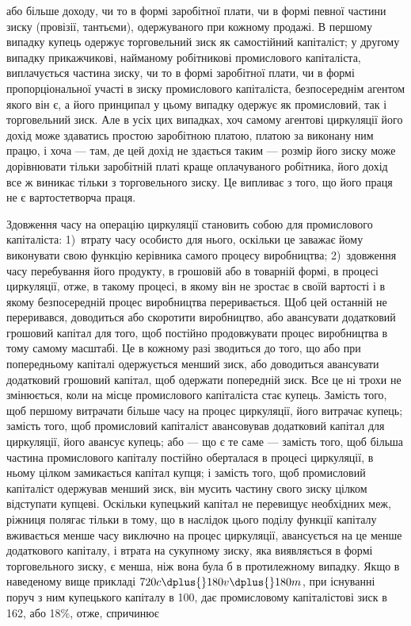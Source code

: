 \parcont{}  %
або більше доходу, чи то в формі заробітної плати, чи в формі
певної частини зиску (провізії, тантьєми), одержуваного при
кожному продажі. В першому випадку купець одержує торговельний
зиск як самостійний капіталіст; у другому випадку прикажчикові,
найманому робітникові промислового капіталіста, виплачується
частина зиску, чи то в формі заробітної плати, чи
в формі пропорціональної участі в зиску промислового капіталіста,
безпосереднім агентом якого він є, а його принципал
у цьому випадку одержує як промисловий, так і торговельний
зиск. Але в усіх цих випадках, хоч самому агентові циркуляції
його дохід може здаватись простою заробітною платою, платою
за виконану ним працю, і хоча — там, де цей дохід не здається
таким — розмір його зиску може дорівнювати тільки заробітній
платі краще оплачуваного робітника, його дохід все ж виникає
тільки з торговельного зиску. Це випливає з того, що його
праця не є вартостетворча праця.

Здовження часу на операцію циркуляції становить собою
для промислового капіталіста: 1)~втрату часу особисто для нього,
оскільки це заважає йому виконувати свою функцію керівника
самого процесу виробництва; 2)~здовження часу перебування
його продукту, в грошовій або в товарній формі, в процесі циркуляції,
отже, в такому процесі, в якому він не зростає в своїй
вартості і в якому безпосередній процес виробництва переривається.
Щоб цей останній не переривався, доводиться або
скоротити виробництво, або авансувати додатковий грошовий
капітал для того, щоб постійно продовжувати процес виробництва
в тому самому масштабі. Це в кожному разі зводиться
до того, що або при попередньому капіталі одержується менший
зиск, або доводиться авансувати додатковий грошовий
капітал, щоб одержати попередній зиск. Все це ні трохи не
змінюється, коли на місце промислового капіталіста стає купець.
Замість того, щоб першому витрачати більше часу на процес
циркуляції, його витрачає купець; замість того, щоб промисловий
капіталіст авансовував додатковий капітал для циркуляції,
його авансує купець; або — що є те саме — замість того,
щоб більша частина промислового капіталу постійно оберталася
в процесі циркуляції, в ньому цілком замикається капітал
купця; і замість того, щоб промисловий капіталіст одержував
менший зиск, він мусить частину свого зиску цілком відступати
купцеві. Оскільки купецький капітал не перевищує необхідних
меж, ріжниця полягає тільки в тому, що в наслідок
цього поділу функції капіталу вживається менше часу виключно
на процес циркуляції, авансується на це менше додаткового
капіталу, і втрата на сукупному зиску, яка виявляється в формі
торговельного зиску, є менша, ніж вона була б в протилежному
випадку. Якщо в наведеному вище прикладі $720c \dplus{} 180v \dplus{} 180m$,
при існуванні поруч з ним купецького капіталу в 100, дає промисловому
капіталістові зиск в 162, або 18\%, отже, спричинює
\parbreak{}  %
